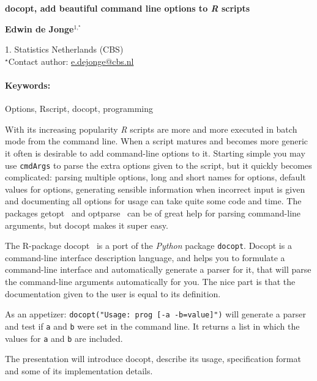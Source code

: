 \documentclass[11pt, a4paper]{article}
\newcommand{\pkg}[1]{{\normalfont\fontseries{b}\selectfont #1}}
\let\proglang=\textit
\let\code=\texttt
\renewcommand{\title}[1]{\begin{center}{\bf \LARGE #1}\end{center}}
\newcommand{\keywords}{\paragraph{Keywords:}}
\begin{document}
\pagestyle{empty}

\title{docopt, add beautiful command line options to \proglang{R} scripts}

\begin{center}
  {\bf Edwin de Jonge$^{1,^\star}$}
\end{center}

\begin{affiliations}
1. Statistics Netherlands (CBS) \\[-2pt]
$^\star$Contact author: \href{mailto:e.dejonge@cbs.nl}{e.dejonge@cbs.nl}\\
\end{affiliations}

\keywords Options, Rscript, docopt, programming

\vskip 0.8cm

With its increasing popularity \proglang{R} scripts are more and more executed in batch mode from the command line. 
When a script matures and becomes more generic it often is desirable to add command-line options to 
it. Starting simple you may use \code{cmdArgs} to parse the extra options given to the script, but it quickly 
becomes complicated: parsing multiple options, long and short names for options, default values for options, 
generating sensible information when incorrect input is given and documenting all options for usage can take 
quite some code and time. The packages \pkg{getopt}~\cite{getopt} and \pkg{optparse}~\cite{optparse} can be of 
great help for parsing command-line arguments, but \pkg{docopt} makes it super easy.

The R-package \pkg{docopt}~\citep{docoptR} is a port of the \proglang{Python} package \code{docopt}.
Docopt is a command-line interface description language, and helps you to formulate a 
command-line interface and automatically generate a parser for it, that will parse the command-line arguments automatically for you. The nice part is that the documentation given to the user is equal to its definition.

As an appetizer: \code{docopt("Usage: prog [-a -b=value]")} will generate a parser and test if \code{a} and \code{b} were set in the command line. It returns a list in which the values for \code{a} and \code{b} 
are included.

The presentation will introduce \pkg{docopt}, describe its usage, specification format and some of its implementation details.

\end{document}
